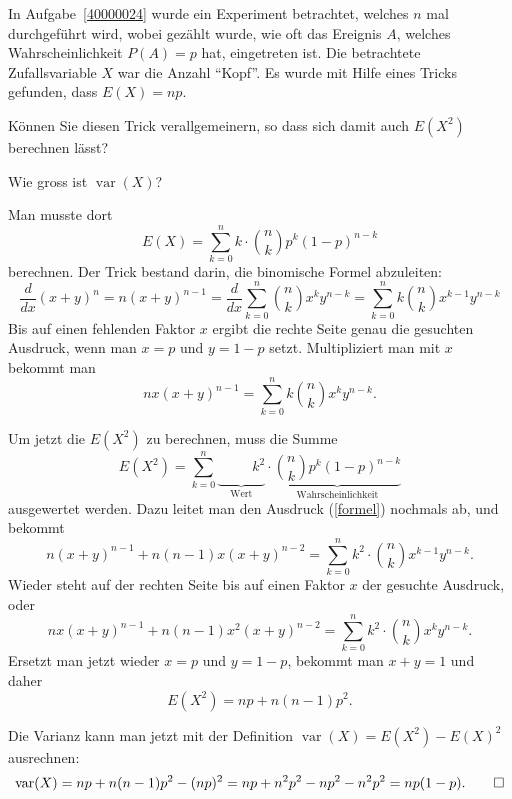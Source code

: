 In Aufgabe~\ref{40000024} wurde ein Experiment betrachtet, welches
$n$ mal durchgeführt wird, wobei gezählt wurde, wie oft das Ereignis
$A$, welches Wahrscheinlichkeit $P(A)=p$ hat, eingetreten ist. Die
betrachtete Zufallsvariable $X$ war die Anzahl ``Kopf''. Es wurde
mit Hilfe eines Tricks gefunden, dass $E(X)=np$.
\begin{teilaufgaben}
\item
Können Sie diesen Trick verallgemeinern, so dass sich damit auch $E(X^2)$
berechnen lässt?
\item Wie gross ist $\operatorname{var}(X)$?
\end{teilaufgaben}

\begin{loesung}
\begin{teilaufgaben}
\item
Man musste dort
\[
E(X)=\sum_{k=0}^nk\cdot \binom{n}{k}p^k(1-p)^{n-k}
\]
berechnen.
Der Trick bestand darin, die binomische Formel abzuleiten:
\[
\frac{d}{dx}(x+y)^n=n(x+y)^{n-1}
=\frac{d}{dx}\sum_{k=0}^n\binom{n}{k}x^ky^{n-k}
=\sum_{k=0}^nk\binom{n}{k}x^{k-1}y^{n-k}
\]
Bis auf einen fehlenden Faktor $x$ ergibt die rechte Seite genau
die gesuchten Ausdruck, wenn man $x=p$ und $y=1-p$ setzt. Multipliziert
man mit $x$ bekommt man
\begin{equation}
nx(x+y)^{n-1}
=
\sum_{k=0}^nk\binom{n}{k}x^ky^{n-k}.
\label{formel}
\end{equation}

Um jetzt die $E(X^2)$ zu berechnen, muss die Summe
\[
E(X^2)=\sum_{k=0}^n\underbrace{\phantom{\binom{n}{k}}k^2}_{\text{Wert}}\cdot\underbrace{\binom{n}{k}p^k(1-p)^{n-k}}_{\text{Wahrscheinlichkeit}}
\]
ausgewertet werden. Dazu leitet man den Ausdruck (\ref{formel}) nochmals
ab, und bekommt
\[
n(x+y)^{n-1}+n(n-1)x(x+y)^{n-2}
=
\sum_{k=0}^nk^2\cdot \binom{n}{k}x^{k-1}y^{n-k}.
\]
Wieder steht auf der rechten Seite bis auf einen Faktor $x$ der gesuchte
Ausdruck, oder
\[
nx(x+y)^{n-1}+n(n-1)x^2(x+y)^{n-2}
=
\sum_{k=0}^nk^2\cdot \binom{n}{k}x^{k}y^{n-k}.
\]
Ersetzt man jetzt wieder $x=p$ und $y=1-p$, bekommt man $x+y=1$ und daher
\[
E(X^2)=np+n(n-1)p^2.
\]
\item
Die Varianz kann man jetzt mit der Definition $\operatorname{var}(X)=E(X^2)-E(X)^2$ ausrechnen:
\[
\operatorname{var}(X)=np+n(n-1)p^2-(np)^2=np +n^2p^2-np^2-n^2p^2=np(1-p).
\qedhere
\]
\end{teilaufgaben}
\end{loesung}

